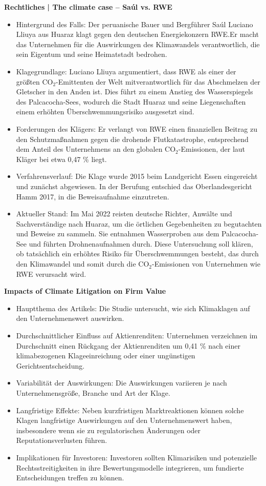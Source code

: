 \documentclass[a4paper, 12pt]{article} %
\begin{document}
\textbf{\cite{RechtlichesClimateCase2022} Rechtliches | The climate case – Saúl vs. RWE}

\begin{itemize}
   \item Hintergrund des Falls: Der peruanische Bauer und Bergführer Saúl Luciano Lliuya aus Huaraz klagt gegen den deutschen Energiekonzern RWE.\@ Er macht das Unternehmen für die Auswirkungen des Klimawandels verantwortlich, die sein Eigentum und seine Heimatstadt bedrohen.
   \item Klagegrundlage: Luciano Lliuya argumentiert, dass RWE als einer der größten CO$_2$-Emittenten der Welt mitverantwortlich für das Abschmelzen der Gletscher in den Anden ist. Dies führt zu einem Anstieg des Wasserspiegels des Palcacocha-Sees, wodurch die Stadt Huaraz und seine Liegenschaften einem erhöhten Überschwemmungsrisiko ausgesetzt sind.
   \item Forderungen des Klägers: Er verlangt von RWE einen finanziellen Beitrag zu den Schutzmaßnahmen gegen die drohende Flutkatastrophe, entsprechend dem Anteil des Unternehmens an den globalen CO$_2$-Emissionen, der laut Kläger bei etwa 0,47 \% liegt. 
   \item Verfahrensverlauf: Die Klage wurde 2015 beim Landgericht Essen eingereicht und zunächst abgewiesen. In der Berufung entschied das Oberlandesgericht Hamm 2017, in die Beweisaufnahme einzutreten. 
   \item Aktueller Stand: Im Mai 2022 reisten deutsche Richter, Anwälte und Sachverständige nach Huaraz, um die örtlichen Gegebenheiten zu begutachten und Beweise zu sammeln. Sie entnahmen Wasserproben aus dem Palcacocha-See und führten Drohnenaufnahmen durch. Diese Untersuchung soll klären, ob tatsächlich ein erhöhtes Risiko für Überschwemmungen besteht, das durch den Klimawandel und somit durch die CO$_2$-Emissionen von Unternehmen wie RWE verursacht wird. 
\end{itemize}

\textbf{\cite{sato2024impacts} Impacts of Climate Litigation on Firm Value}

\begin{itemize}
   \item Hauptthema des Artikels: Die Studie untersucht, wie sich Klimaklagen auf den Unternehmenswert auswirken.
   \item Durchschnittlicher Einfluss auf Aktienrenditen: Unternehmen verzeichnen im Durchschnitt einen Rückgang der Aktienrenditen um 0,41 \% nach einer klimabezogenen Klageeinreichung oder einer ungünstigen Gerichtsentscheidung.
   \item Variabilität der Auswirkungen: Die Auswirkungen variieren je nach Unternehmensgröße, Branche und Art der Klage.
   \item Langfristige Effekte: Neben kurzfristigen Marktreaktionen können solche Klagen langfristige Auswirkungen auf den Unternehmenswert haben, insbesondere wenn sie zu regulatorischen Änderungen oder Reputationsverlusten führen.
   \item Implikationen für Investoren: Investoren sollten Klimarisiken und potenzielle Rechtsstreitigkeiten in ihre Bewertungsmodelle integrieren, um fundierte Entscheidungen treffen zu können.
\end{itemize}
\end{document}
